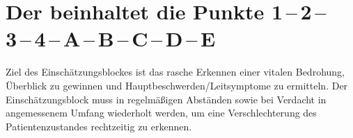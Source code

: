 \clearpage
\section{Der  beinhaltet die Punkte 
1\,--\,2\,--\,3\,--\,4\,--\,A\,--\,B\,--\,C\,--\,D\,--\,E}
\label{topic:ersteinschaetzung-advanced}
\label{topic:einschaetzungsblock-advanced}

\begin{quote}
\end{quote}

Ziel des Einschätzungsblockes ist das rasche Erkennen einer
vitalen Bedrohung, Überblick zu gewinnen und
Hauptbeschwerden/Leitsymptome zu ermitteln. Der
Einschätzungsblock muss in regelmäßigen Abständen sowie bei
Verdacht in angemessenem Umfang wiederholt werden, um eine
Verschlechterung des Patientenzustandes rechtzeitig zu
erkennen. 

